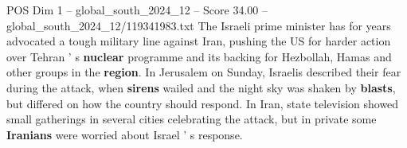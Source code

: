 \begin{textsample}{POS Dim 1 – global\_south\_2024\_12 – Score 34.00 – global\_south\_2024\_12/119341983.txt}
The Israeli prime minister has for years advocated a tough military line against Iran, pushing the US for harder action over Tehran ' s \textbf{nuclear} programme and its backing for Hezbollah, Hamas and other groups in the \textbf{region}.
In Jerusalem on Sunday, Israelis described their fear during the attack, when \textbf{sirens} wailed and the night sky was shaken by \textbf{blasts}, but differed on how the country should respond.
In Iran, state television showed small gatherings in several cities celebrating the attack, but in private some \textbf{Iranians} were worried about Israel ' s response.

\end{textsample}
